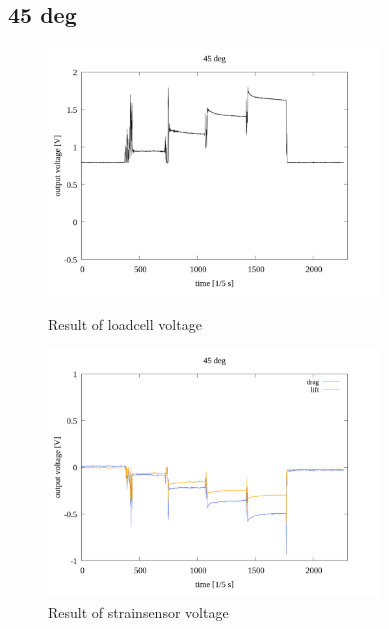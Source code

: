 \documentclass[twocolumn,a4j]{jsarticle}
\begin{document}
\subsection{45 deg}
\begin{figure}[htbp]
    \footnotesize
    \begin{center}
        \includegraphics[width=88mm]{../images/reverse/45_loadcell.png}
        \caption{Result of loadcell voltage}
        \includegraphics[width=88mm]{../images/reverse/45_strainsensor.png}
        \caption{Result of strainsensor voltage}
    \end{center}
\end{figure}

\newpage
\end{document}
